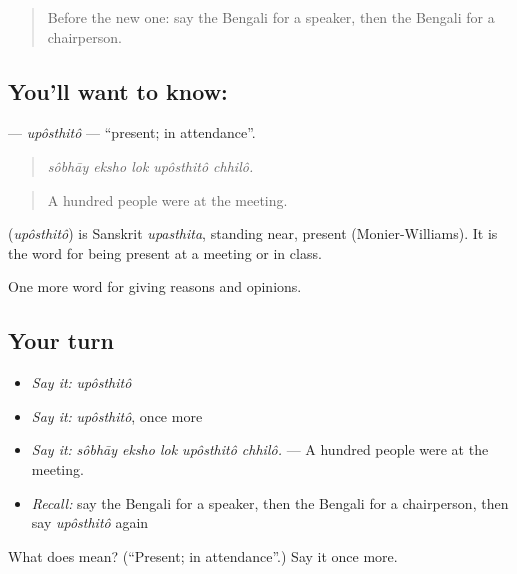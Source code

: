 \begin{quote}
Before the new one: say the Bengali for a speaker, then the Bengali for a chairperson.
\end{quote}

\subsection*{You'll want to know: }
\textbf{} — \emph{upôsthitô} — \textquotedblleft{}present; in attendance\textquotedblright{}.

\begin{quote}
    
\end{quote}

\begin{quote}
\emph{sôbhāy eksho lok upôsthitô chhilô.}
\end{quote}

\begin{quote}
A hundred people were at the meeting.
\end{quote}

\begin{cousinweb}
\textbf{} (\emph{upôsthitô}) is Sanskrit \emph{upasthita}, standing near, present (Monier-Williams). It is the word for being present at a meeting or in class.
\end{cousinweb}

\begin{grammarlens}[title={What you've built}]
One more word for giving reasons and opinions.
\end{grammarlens}

\subsection*{Your turn}
\begin{itemize}
\raggedright
  \item \emph{Say it:} \emph{upôsthitô}
  \item \emph{Say it:} \emph{upôsthitô}, once more
  \item \emph{Say it:} \emph{sôbhāy eksho lok upôsthitô chhilô.} — A hundred people were at the meeting.
  \item \emph{Recall:} say the Bengali for a speaker, then the Bengali for a chairperson, then say \emph{upôsthitô} again
\end{itemize}

\begin{tcolorbox}[breakable,colback=teal!4,colframe=teal!35!black,title={Before you move on}]
What does  mean? (\textquotedblleft{}Present; in attendance\textquotedblright{}.) Say it once more.
\end{tcolorbox}
